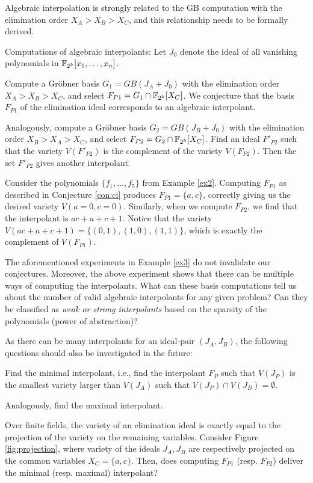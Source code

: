Algebraic interpolation is strongly related
to the GB computation with the elimination order $X_A>X_B>X_C$, and
this relationship needs to be formally derived. 

\begin{Conjecture} \label{con:ci}
Computations of algebraic interpolants: Let $J_0$ denote the ideal of
all vanishing polynomials in ${\mathbb{F}}_{2^k}[x_1,\dots,x_n]$.
\bi
\item  Compute a Gr\"obner basis $G_1 = GB(J_A + J_0)$ 
with the elimination order $X_A > X_B > X_C$, and select
$F_{P1}=G_1\cap{\mathbb{F}}_{2^k}[X_C]$. We conjecture that the \Grobner
basis $F_{P1}$ of the elimination ideal corresponds to an algebraic
interpolant. 

\item Analogously, compute a Gr\"obner basis $G_2 = GB(J_B + J_0)$ 
with the elimination order $X_B > X_A > X_C$, and select
$F_{P2}=G_2\cap{\mathbb{F}}_{2^k}[X_C]$. Find an ideal $F'_{P2}$ such that
the variety $V(F'_{P2})$ is the complement of the variety
$V(F_{P2})$. Then the set $F'_{P2}$ gives another interpolant.
\ei
\end{Conjecture}


\begin{Example}\label{ex3}
Consider the polynomials $\{f_1, \dots,f_5\}$ from Example
\ref{ex2}. Computing $F_{P1}$ as described in Conjecture \ref{con:ci} 
produces $F_{P1} = \{a, c\}$, correctly giving us the desired variety
$V(a = 0, c = 0)$. Similarly, when we compute $F_{P2}$, we find that
the interpolant is $ac + a + c + 1$. Notice that the variety 
$V(ac+a+c+1)=\{(0,1), (1,0), (1,1)\}$, which is exactly the complement
of $V(F_{P1})$.  
\end{Example}

The aforementioned experiments in Example \ref{ex3} do not invalidate
our conjectures. Moreover, the above experiment shows that there can be
multiple ways of computing the interpolants. What can these \Grobner
basis computations tell us about the number of valid algebraic
interpolants for any given problem? Can they be classified as {\it weak
  or strong interpolants} based on the sparsity of the polynomials
(power of abstraction)? 

As there can be many interpolants for an ideal-pair $(J_A, J_B)$, 
the following questions should also be investigated in the future:
\bi
\item Find the minimal interpolant, i.e., find the interpolant $F_P$
  such that $V(J_P)$ is the smallest variety larger than $V(J_A)$ such
  that $V(J_P) \cap V(J_B) = \emptyset$.
\item Analogously, find the maximal interpolant. 
\item Over finite fields, the variety of an elimination ideal is
  exactly equal to the projection of the variety on the remaining
  variables. Consider Figure \ref{fig:projection}, where variety of the
  ideals $J_A, J_B$ are respectively projected on the common variables
  $X_C = \{a, c\}$. Then, does computing $F_{P1}$ (resp. $F_{P2}$) 
  deliver the minimal (resp. maximal) interpolant?
\ei


